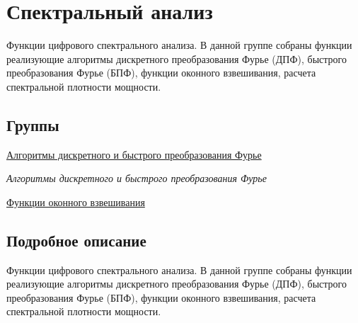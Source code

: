 \hypertarget{group___s_p_e_c_t_r_a_l___g_r_o_u_p}{}\section{Спектральный анализ}
\label{group___s_p_e_c_t_r_a_l___g_r_o_u_p}


Функции цифрового спектрального анализа. В данной группе собраны функции реализующие алгоритмы дискретного преобразования Фурье (ДПФ), быстрого преобразования Фурье (БПФ), функции оконного взвешивания, расчета спектральной плотности мощности.  


\subsection*{Группы}
\begin{DoxyCompactItemize}
\item 
\hyperlink{group___d_f_t___g_r_o_u_p}{Алгоритмы дискретного и быстрого преобразования Фурье}
\begin{DoxyCompactList}\small\item\em Алгоритмы дискретного и быстрого преобразования Фурье \end{DoxyCompactList}\item 
\hyperlink{group___w_i_n___g_r_o_u_p}{Функции оконного взвешивания}
\end{DoxyCompactItemize}


\subsection{Подробное описание}
Функции цифрового спектрального анализа. В данной группе собраны функции реализующие алгоритмы дискретного преобразования Фурье (ДПФ), быстрого преобразования Фурье (БПФ), функции оконного взвешивания, расчета спектральной плотности мощности. 


